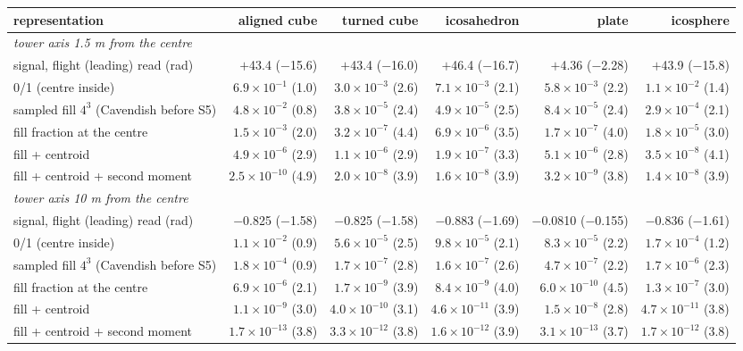 \begin{tabular}{lrrrrr}
\toprule
representation & aligned cube & turned cube & icosahedron & plate & icosphere \\
\midrule
\multicolumn{6}{l}{\textit{tower axis 1.5 m from the centre}} \\
signal, flight (leading) read (rad) & $+$43.4 ($-$15.6) & $+$43.4 ($-$16.0) & $+$46.4 ($-$16.7) & $+$4.36 ($-$2.28) & $+$43.9 ($-$15.8) \\
0/1 (centre inside) & $6.9\times10^{-1}$ (1.0) & $3.0\times10^{-3}$ (2.6) & $7.1\times10^{-3}$ (2.1) & $5.8\times10^{-3}$ (2.2) & $1.1\times10^{-2}$ (1.4) \\
sampled fill $4^3$ (Cavendish before S5) & $4.8\times10^{-2}$ (0.8) & $3.8\times10^{-5}$ (2.4) & $4.9\times10^{-5}$ (2.5) & $8.4\times10^{-5}$ (2.4) & $2.9\times10^{-4}$ (2.1) \\
fill fraction at the centre & $1.5\times10^{-3}$ (2.0) & $3.2\times10^{-7}$ (4.4) & $6.9\times10^{-6}$ (3.5) & $1.7\times10^{-7}$ (4.0) & $1.8\times10^{-5}$ (3.0) \\
fill + centroid & $4.9\times10^{-6}$ (2.9) & $1.1\times10^{-6}$ (2.9) & $1.9\times10^{-7}$ (3.3) & $5.1\times10^{-6}$ (2.8) & $3.5\times10^{-8}$ (4.1) \\
fill + centroid + second moment & $2.5\times10^{-10}$ (4.9) & $2.0\times10^{-8}$ (3.9) & $1.6\times10^{-8}$ (3.9) & $3.2\times10^{-9}$ (3.8) & $1.4\times10^{-8}$ (3.9) \\
\midrule
\multicolumn{6}{l}{\textit{tower axis 10 m from the centre}} \\
signal, flight (leading) read (rad) & $-$0.825 ($-$1.58) & $-$0.825 ($-$1.58) & $-$0.883 ($-$1.69) & $-$0.0810 ($-$0.155) & $-$0.836 ($-$1.61) \\
0/1 (centre inside) & $1.1\times10^{-2}$ (0.9) & $5.6\times10^{-5}$ (2.5) & $9.8\times10^{-5}$ (2.1) & $8.3\times10^{-5}$ (2.2) & $1.7\times10^{-4}$ (1.2) \\
sampled fill $4^3$ (Cavendish before S5) & $1.8\times10^{-4}$ (0.9) & $1.7\times10^{-7}$ (2.8) & $1.6\times10^{-7}$ (2.6) & $4.7\times10^{-7}$ (2.2) & $1.7\times10^{-6}$ (2.3) \\
fill fraction at the centre & $6.9\times10^{-6}$ (2.1) & $1.7\times10^{-9}$ (3.9) & $8.4\times10^{-9}$ (4.0) & $6.0\times10^{-10}$ (4.5) & $1.3\times10^{-7}$ (3.0) \\
fill + centroid & $1.1\times10^{-9}$ (3.0) & $4.0\times10^{-10}$ (3.1) & $4.6\times10^{-11}$ (3.9) & $1.5\times10^{-8}$ (2.8) & $4.7\times10^{-11}$ (3.8) \\
fill + centroid + second moment & $1.7\times10^{-13}$ (3.8) & $3.3\times10^{-12}$ (3.8) & $1.6\times10^{-12}$ (3.9) & $3.1\times10^{-13}$ (3.7) & $1.7\times10^{-12}$ (3.8) \\
\bottomrule
\end{tabular}
